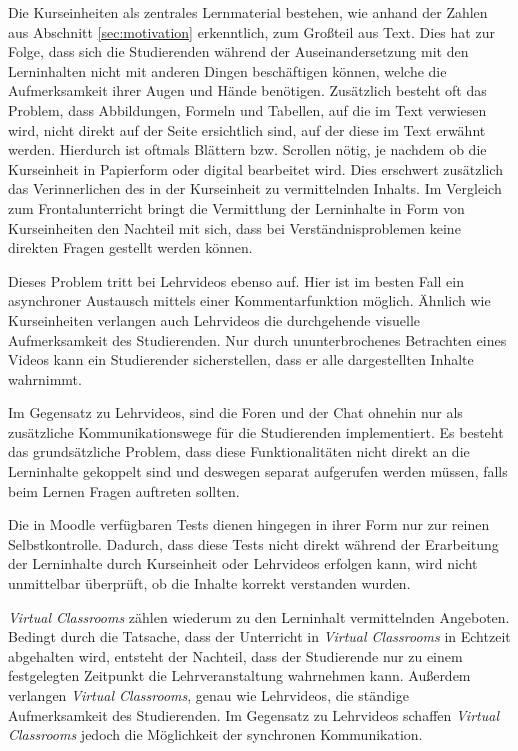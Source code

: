 Die Kurseinheiten als zentrales Lernmaterial bestehen, wie anhand der Zahlen aus Abschnitt \ref{sec:motivation} erkenntlich, zum Großteil aus Text. Dies hat zur Folge, dass sich die Studierenden während der Auseinandersetzung mit den Lerninhalten nicht mit anderen Dingen beschäftigen können, welche die Aufmerksamkeit ihrer Augen und Hände benötigen. Zusätzlich besteht oft das Problem, dass Abbildungen, Formeln und Tabellen, auf die im Text verwiesen wird, nicht direkt auf der Seite ersichtlich sind, auf der diese im Text erwähnt werden. Hierdurch ist oftmals Blättern bzw. Scrollen nötig, je nachdem ob die Kurseinheit in Papierform oder digital bearbeitet wird. Dies erschwert zusätzlich das Verinnerlichen des in der Kurseinheit zu vermittelnden Inhalts. Im Vergleich zum Frontalunterricht bringt die Vermittlung der Lerninhalte in Form von Kurseinheiten den Nachteil mit sich, dass bei Verständnisproblemen keine direkten Fragen gestellt werden können.

Dieses Problem tritt bei Lehrvideos ebenso auf. Hier ist im besten Fall ein asynchroner Austausch mittels einer Kommentarfunktion möglich. Ähnlich wie Kurseinheiten verlangen auch Lehrvideos die durchgehende visuelle Aufmerksamkeit des Studierenden. Nur durch ununterbrochenes Betrachten eines Videos kann ein Studierender sicherstellen, dass er alle dargestellten Inhalte wahrnimmt.

Im Gegensatz zu Lehrvideos, sind die Foren und der Chat ohnehin nur als zusätzliche Kommunikationswege für die Studierenden implementiert. Es besteht das grundsätzliche Problem, dass diese Funktionalitäten nicht direkt an die Lerninhalte gekoppelt sind und deswegen separat aufgerufen werden müssen, falls beim Lernen Fragen auftreten sollten. 

Die in Moodle verfügbaren Tests dienen hingegen in ihrer Form nur zur reinen Selbstkontrolle. Dadurch, dass diese Tests nicht direkt während der Erarbeitung der Lerninhalte durch Kurseinheit oder Lehrvideos erfolgen kann, wird nicht unmittelbar überprüft, ob die Inhalte korrekt verstanden wurden.

\textit{Virtual Classrooms} zählen wiederum zu den Lerninhalt vermittelnden Angeboten. Bedingt durch die Tatsache, dass der Unterricht in \textit{Virtual Classrooms} in Echtzeit abgehalten wird, entsteht der Nachteil, dass der Studierende nur zu einem festgelegten Zeitpunkt die Lehrveranstaltung wahrnehmen kann. Außerdem verlangen \textit{Virtual Classrooms}, genau wie Lehrvideos, die ständige Aufmerksamkeit des Studierenden. Im Gegensatz zu Lehrvideos schaffen \textit{Virtual Classrooms} jedoch die Möglichkeit der synchronen Kommunikation.

